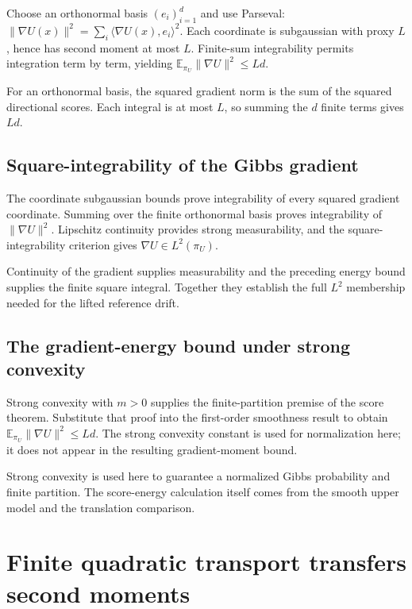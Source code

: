 \documentclass[11pt,a4paper]{article}
\begin{document}
Choose an orthonormal basis \((e_i)_{i=1}^d\) and use Parseval: \(\|\nabla U(x)\|^2=\sum_i\langle\nabla U(x),e_i\rangle^2\). Each coordinate is subgaussian with proxy \(L\), hence has second moment at most \(L\). Finite-sum integrability permits integration term by term, yielding \(\mathbb E_{\pi_U}\|\nabla U\|^2\le Ld\).



For an orthonormal basis, the squared gradient norm is the sum of the squared directional scores. Each integral is at most \(L\), so summing the \(d\) finite terms gives \(Ld\).


\subsection{\texorpdfstring{Square-integrability of the Gibbs gradient}{Square-integrability of the Gibbs gradient}}


The coordinate subgaussian bounds prove integrability of every squared gradient coordinate. Summing over the finite orthonormal basis proves integrability of \(\|\nabla U\|^2\). Lipschitz continuity provides strong measurability, and the square-integrability criterion gives \(\nabla U\in L^2(\pi_U)\).



Continuity of the gradient supplies measurability and the preceding energy bound supplies the finite square integral. Together they establish the full \(L^2\) membership needed for the lifted reference drift.


\subsection{\texorpdfstring{The gradient-energy bound under strong convexity}{The gradient-energy bound under strong convexity}}


Strong convexity with \(m>0\) supplies the finite-partition premise of the score theorem. Substitute that proof into the first-order smoothness result to obtain \(\mathbb E_{\pi_U}\|\nabla U\|^2\le Ld\). The strong convexity constant is used for normalization here; it does not appear in the resulting gradient-moment bound.



Strong convexity is used here to guarantee a normalized Gibbs probability and finite partition. The score-energy calculation itself comes from the smooth upper model and the translation comparison.


\section{\texorpdfstring{Finite quadratic transport transfers second moments}{Finite quadratic transport transfers second moments}}
\end{document}
